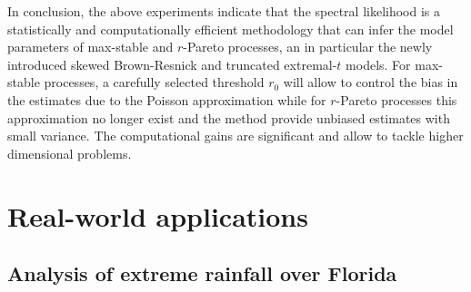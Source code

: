 \documentclass[12pt]{article}
\begin{document}
In conclusion, the above experiments indicate that the spectral likelihood is a statistically and computationally efficient methodology that can infer the model parameters of max-stable and $r$-Pareto processes, an in particular the newly introduced skewed Brown-Resnick and truncated extremal-$t$ models. For max-stable processes, a carefully selected threshold $r_0$ will allow to control the bias in the estimates due to the Poisson approximation while for $r$-Pareto processes this approximation no longer exist and the method provide unbiased estimates with small variance. The computational gains are significant and allow to tackle higher dimensional problems.

\section{Real-world applications}
\label{sec:real}

\subsection{Analysis of extreme rainfall over Florida}
\end{document}
